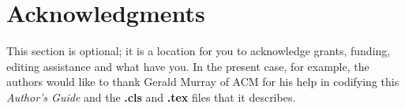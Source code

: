 \documentclass{acm_proc_article-sp}
\begin{document}
\section{Acknowledgments}
This section is optional; it is a location for you
to acknowledge grants, funding, editing assistance and
what have you.  In the present case, for example, the
authors would like to thank Gerald Murray of ACM for
his help in codifying this \textit{Author's Guide}
and the \textbf{.cls} and \textbf{.tex} files that it describes.


\begin{thebibliography}{1}
\end{thebibliography}

\balancecolumns
\end{document}
